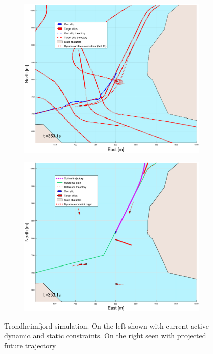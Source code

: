 \begin{figure}[ht]
\begin{subfigure}[b]{0.499\textwidth}
    \end{subfigure}
    \hfill
    \\
    \begin{subfigure}[b]{0.49\textwidth}
        \centering
        \includegraphics[width=\textwidth]{Images/Figures/Trheimfjord/_Simple_1fig1_time=350}
    \end{subfigure}
    \hfill
    \begin{subfigure}[b]{0.499\textwidth}
        \centering
        \includegraphics[width=\textwidth]{Images/Figures/Trheimfjord/_Simple_1fig999_time=350}
    \end{subfigure}
    \hfill
    \caption{Trondheimfjord simulation. On the left shown with current active dynamic and static constraints. On the right seen with projected future trajectory}
\end{figure}




